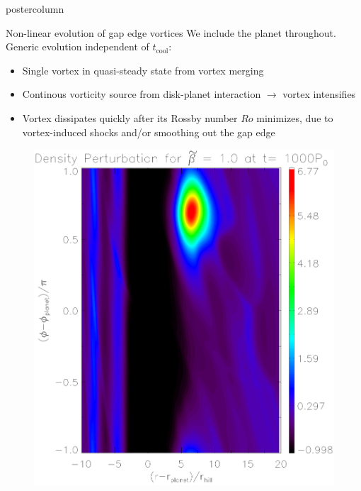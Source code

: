 \documentclass[final,hyperref={pdfpagelabels=false}]{beamer}
\begin{document}
\begin{frame}
\begin{columns}
\begin{column}{.49\textwidth}
\begin{beamercolorbox}[center,wd=\textwidth]{postercolumn}
\begin{minipage}[T]{.95\textwidth}
{            \begin{block}{\Large{Non-linear evolution of gap edge
                  vortices}}
              \justifying
              We include the planet throughout. Generic evolution independent of $t_\mathrm{cool}$:
              \begin{itemize}
              \item Single vortex in quasi-steady state from vortex merging
              \item Continous vorticity source from disk-planet interaction
                $\to$ vortex intensifies
              \item Vortex dissipates quickly after its Rossby number
                $Ro$ minimizes, due to vortex-induced shocks and/or smoothing out the
                gap edge  
              \end{itemize}
                  \begin{figure}
                    \centering
                    \hfill
                    \begin{minipage}{0.3\textwidth}
                      \includegraphics[width=\textwidth]{Posterfig_Before}

\end{minipage}
\end{figure}
\end{block}}
\end{minipage}
\end{beamercolorbox}
\end{column}
\end{columns}
\end{frame}
\end{document}

